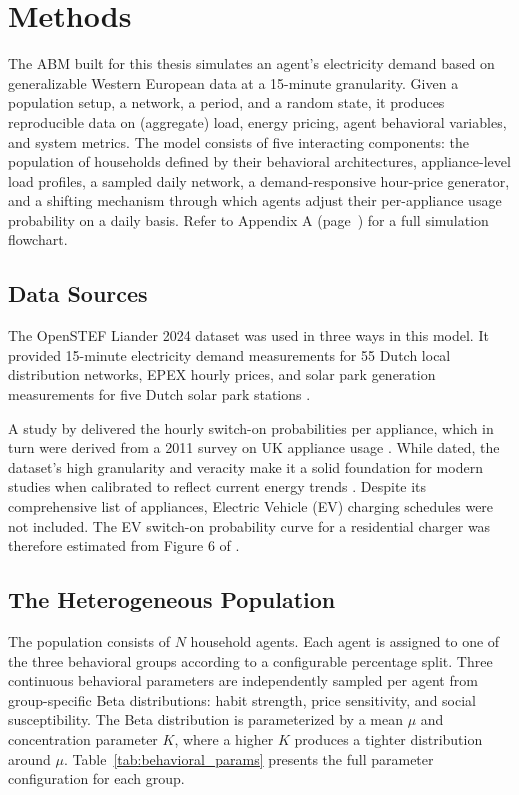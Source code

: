 \documentclass[11pt, a4paper]{article}
\begin{document}
\section{Methods} \label{sec:Methods}

The ABM built for this thesis simulates an agent's electricity demand based on generalizable Western European data at a 15-minute granularity. Given a population setup, a network, a period, and a random state, it produces reproducible data on (aggregate) load, energy pricing, agent behavioral variables, and system metrics. The model consists of five interacting components: the population of households defined by their behavioral architectures, appliance-level load profiles, a sampled daily network, a demand-responsive hour-price generator, and a shifting mechanism through which agents adjust their per-appliance usage probability on a daily basis. Refer to Appendix A (page~\pageref{app:a}) for a full simulation flowchart.

\subsection{Data Sources} \label{subs:data}
The OpenSTEF Liander 2024 dataset was used in three ways in this model. It provided 15-minute electricity demand measurements for 55 Dutch local distribution networks, EPEX hourly prices, and solar park generation measurements for five Dutch solar park stations \autocite{liander_openstefliander2024-energy-forecasting-benchmark_2024}. 

A study by \textcite{yilmaz_occupant_2017} delivered the hourly switch-on probabilities per appliance, which in turn were derived from a 2011 survey on UK appliance usage \autocite{department_of_energy__climate_change_household_2014}. While dated, the dataset's high granularity and veracity make it a solid foundation for modern studies when calibrated to reflect current energy trends \autocite{yilmaz_occupant_2017,williams_residential_2025}. Despite its comprehensive list of appliances, Electric Vehicle (EV) charging schedules were not included. The EV switch-on probability curve for a residential charger was therefore estimated from Figure 6 of \textcite{robinson_analysis_2013}.

\subsection{The Heterogeneous Population} \label{subs:population}
The population consists of $N$ household agents. Each agent is assigned to one of the three behavioral groups according to a configurable percentage split. Three continuous behavioral parameters are independently sampled per agent from group-specific Beta distributions: habit strength, price sensitivity, and social susceptibility. The Beta distribution is parameterized by a mean $\mu$ and concentration parameter $K$, where a higher $K$ produces a tighter distribution around $\mu$. Table~\ref{tab:behavioral_params} presents the full parameter configuration for each group.
\pagebreak
\end{document}
